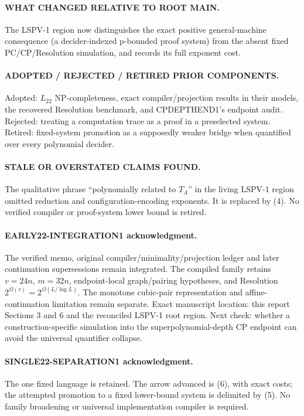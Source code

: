 \documentclass[11pt]{article}
\newcommand{\Ltwo}{L_{22}}
\begin{document}
\paragraph{WHAT CHANGED RELATIVE TO ROOT MAIN.}
The LSPV-1 region now distinguishes the exact positive general-machine
consequence (a decider-indexed p-bounded proof system) from the absent fixed
PC/CP/Resolution simulation, and records its full exponent cost.

\paragraph{ADOPTED / REJECTED / RETIRED PRIOR COMPONENTS.}
Adopted: $\Ltwo$ NP-completeness, exact compiler/projection results in their
models, the recovered Resolution benchmark, and CPDEPTHEND1's endpoint audit.
Rejected: treating a computation trace as a proof in a preselected system.
Retired: fixed-system promotion as a supposedly weaker bridge when quantified
over every polynomial decider.

\paragraph{STALE OR OVERSTATED CLAIMS FOUND.}
The qualitative phrase ``polynomially related to $T_A$'' in the living
LSPV-1 region omitted reduction and configuration-encoding exponents.  It is
replaced by (4).  No verified compiler or proof-system lower bound is retired.

\paragraph{EARLY22-INTEGRATION1 acknowledgment.}
The verified memo, original compiler/minimality/projection ledger and later
continuation supersessions remain integrated.  The compiled family retains
$v=24n$, $m=32n$, endpoint-local graph/pairing hypotheses, and Resolution
$2^{\Omega(v)}=2^{\Omega(L/\log L)}$.  The monotone cubic-pair representation
and affine-continuation limitation remain separate.  Exact manuscript
location: this report Sections 3 and 6 and the reconciled LSPV-1 root region.
Next check: whether a construction-specific simulation into the
superpolynomial-depth CP endpoint can avoid the universal quantifier collapse.

\paragraph{SINGLE22-SEPARATION1 acknowledgment.}
The one fixed language is retained.  The arrow advanced is (6), with exact
costs; the attempted promotion to a fixed lower-bound system is delimited by
(5).  No family broadening or universal implementation compiler is required.
\end{document}
